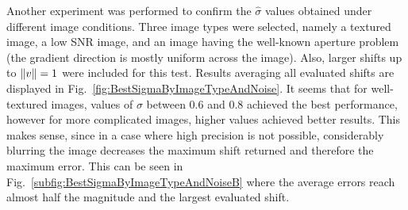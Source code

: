Another experiment was performed to confirm the $\hat{\sigma}$ values obtained under different image conditions. Three image types were selected, namely a textured image, a low SNR image, and an image having the well-known aperture problem (the gradient direction is mostly uniform across the image). Also, larger shifts up to $\left\lVert v\right\rVert = 1$ were included for this test. Results averaging all evaluated shifts are displayed in Fig.~\ref{fig:BestSigmaByImageTypeAndNoise}. It seems that for well-textured images, values of $\sigma$ between 0.6 and 0.8 achieved the best performance, however for more complicated images, higher values achieved better results. This makes sense, since in a case where high precision is not possible, considerably blurring the image decreases the maximum shift returned and therefore the maximum error. This can be seen in Fig.~\ref{subfig:BestSigmaByImageTypeAndNoiseB} where the average errors reach almost half the magnitude and the largest evaluated shift. 
